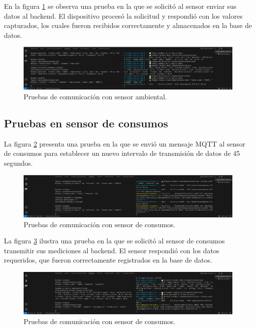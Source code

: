 En la figura \ref{fig:prueba_mqtt_sensor_ambiental_2} se observa una prueba en
la que se solicitó al sensor enviar sus datos al backend. El dispositivo
procesó la solicitud y respondió con los valores capturados, los cuales fueron
recibidos correctamente y almacenados en la base de datos.

\begin{figure}[H]
    \centering
    \includegraphics[width=\textwidth]{Images/55_prueba_mqtt_sensor_ambiental_2.png}
    \caption[Pruebas de comunicación con sensor ambiental]{Pruebas de comunicación con sensor ambiental.}
    \label{fig:prueba_mqtt_sensor_ambiental_2}
\end{figure}

\subsection{Pruebas en sensor de consumos}

La figura \ref{fig:prueba_mqtt_sensor_consumos_1} presenta una prueba en la que
se envió un mensaje MQTT al sensor de consumos para establecer un nuevo
intervalo de transmisión de datos de 45 segundos.

\begin{figure}[H]
    \centering
    \includegraphics[width=\textwidth]{Images/56_prueba_mqtt_sensor_consumos_1.png}
    \caption[Pruebas de comunicación con sensor de consumos]{Pruebas de comunicación con sensor de consumos.}
    \label{fig:prueba_mqtt_sensor_consumos_1}
\end{figure}

La figura \ref{fig:prueba_mqtt_sensor_consumos_2} ilustra una prueba en la que
se solicitó al sensor de consumos transmitir sus mediciones al backend. El
sensor respondió con los datos requeridos, que fueron correctamente registrados
en la base de datos.

\begin{figure}[H]
    \centering
    \includegraphics[width=\textwidth]{Images/56_prueba_mqtt_sensor_consumos_2.png}
    \caption[Pruebas de comunicación con sensor de consumos]{Pruebas de comunicación con sensor de consumos.}
    \label{fig:prueba_mqtt_sensor_consumos_2}
\end{figure}

